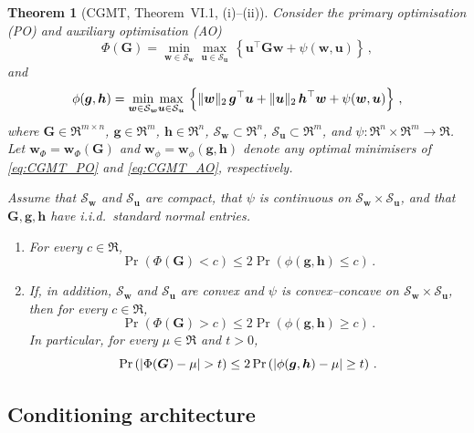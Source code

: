 \documentclass{article}
\makeatletter
\newtheorem{theorem}{Theorem}[section]
\theoremstyle{definition}
\newcommand{\vnorm}[1]{%
	\ensuremath{%
		\if@display
		\left\| #1 \right\|
		\else
		\| #1 \|
		\fi
	}%
}
\newcommand{\abs}[1]{%
	\ensuremath{%
		\if@display
		\left| #1 \right|
		\else
		\lvert #1 \rvert
		\fi
	}%
}
\newcommand*{\bb}{\boldsymbol}
\def\bw {\bb{w}}
\def\bu{\bb{u}}
\def\bh{\bb{h}}
\def\bg{\bb{g}}
\makeatother
\begin{document}
\begin{bibunit}
\begin{theorem}[CGMT, \cite{thrampoulidis+etal:2018} Theorem~VI.1, (i)--(ii)]
\label{thm:cgmt}
Consider the primary optimisation (PO) and auxiliary optimisation (AO)
\begin{equation}
\label{eq:CGMT_PO}
\Phi(\bb G)
=
\underset{\bw \in \mathcal S_{\bw}}{\min}
\underset{\bu \in \mathcal S_{\bu}}{\max}
\, \left\{ \bu^\top \bb G \bw + \psi(\bw,\bu) \right\} \,,
\end{equation}
and
\begin{equation}
\label{eq:CGMT_AO}
\phi(\bg,\bh)
=
\underset{\bw \in \mathcal S_{\bw}}{\min}
\underset{\bu \in \mathcal S_{\bu}}{\max}
\, \left\{ \vnorm{\bw}_2 \, \bg^\top \bu + \vnorm{\bu}_2 \, \bh^\top \bw + \psi(\bw,\bu) \right\} \,,
\end{equation}
where $\bb G \in \Re^{m \times n}$, $\bg \in \Re^{m}$, $\bh \in \Re^{n}$, $\mathcal S_{\bw} \subset \Re^{n}$,
$\mathcal S_{\bu} \subset \Re^{m}$, and $\psi : \Re^{n} \times \Re^{m} \to \Re$.
Let $\bw_{\Phi} = \bw_{\Phi}(\bb G)$ and $\bw_{\phi} = \bw_{\phi}(\bg,\bh)$ denote any optimal minimisers of
\eqref{eq:CGMT_PO} and \eqref{eq:CGMT_AO}, respectively.

Assume that $\mathcal S_{\bw}$ and $\mathcal S_{\bu}$ are compact, that $\psi$ is continuous on
$\mathcal S_{\bw} \times \mathcal S_{\bu}$, and that $\bb G,\bg,\bh$ have i.i.d.\ standard normal entries.

\begin{enumerate}[label=(\roman*)]
	\item For every $c \in \Re$,
	$$
	\Pr\left( \Phi(\bb G) < c \right)
	\leq 2 \Pr\left( \phi(\bg,\bh) \leq c \right) \,.
	$$

	\item If, in addition, $\mathcal S_{\bw}$ and $\mathcal S_{\bu}$ are convex and $\psi$ is convex--concave on
	$\mathcal S_{\bw} \times \mathcal S_{\bu}$, then for every $c \in \Re$,
	$$
	\Pr\left( \Phi(\bb G) > c \right)
	\leq 2 \Pr\left( \phi(\bg,\bh) \geq c \right) \,.
	$$
	In particular, for every $\mu \in \Re$ and $t > 0$,
	$$
	\Pr\left( \abs{\Phi(\bb G) - \mu} > t \right)
	\leq 2 \Pr\left( \abs{\phi(\bg,\bh) - \mu} \geq t \right) \,.
	$$
\end{enumerate}
\end{theorem}


\subsection{Conditioning architecture}
\label{sec:good-events}


\end{bibunit}
\end{document}
